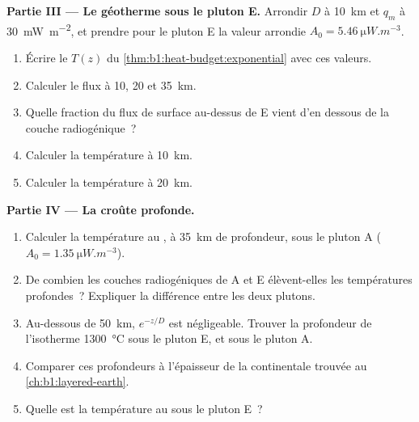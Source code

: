 \begin{problem}
\noindent\textbf{Partie III --- Le géotherme sous le pluton E.}
Arrondir $D$ à \qty{10}{km} et $q_m$ à \qty{30}{mW.m^{-2}}, et prendre pour le
pluton E la valeur arrondie $A_0 = \qty{5.46}{\micro W.m^{-3}}$.
\begin{enumerate}[resume]
  \item Écrire le  $T(z)$ du \cref{thm:b1:heat-budget:exponential} avec
        ces valeurs.
  \item Calculer le flux à 10, 20 et \qty{35}{km}.
  \item Quelle fraction du flux de surface au-dessus de E vient d'en dessous de la
        couche radiogénique~?
  \item Calculer la température à \qty{10}{km}.
  \item Calculer la température à \qty{20}{km}.
\end{enumerate}
\noindent\textbf{Partie IV --- La croûte profonde.}
\begin{enumerate}[resume]
  \item Calculer la température au , à \qty{35}{km} de profondeur, sous le pluton A
        ($A_0 = \qty{1.35}{\micro W.m^{-3}}$).
  \item De combien les couches radiogéniques de A et E élèvent-elles les températures
        profondes~? Expliquer la différence entre les deux plutons.
  \item Au-dessous de \qty{50}{km}, $e^{-z/D}$ est négligeable. Trouver la profondeur de
        l'isotherme \qty{1300}{\degreeCelsius} sous le pluton E, et sous le pluton A.
  \item Comparer ces profondeurs à l'épaisseur de la  continentale
        trouvée au \cref{ch:b1:layered-earth}.
  \item Quelle est la température au  sous le pluton E~?
\end{enumerate}
\end{problem}
